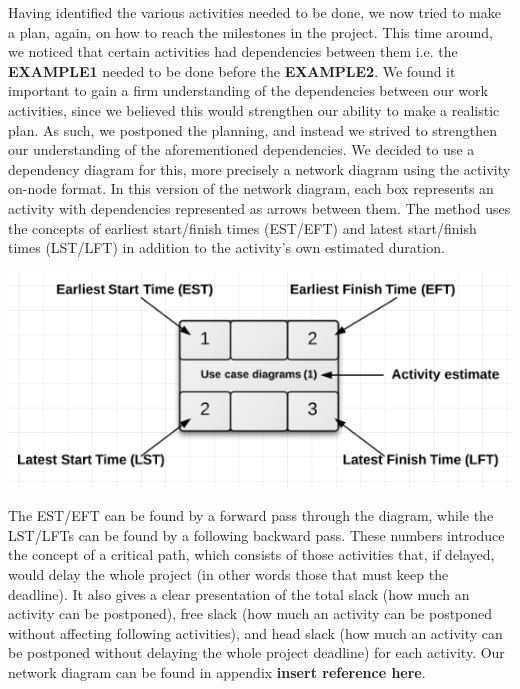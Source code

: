 Having identified the various activities needed to be done, we now tried to make a plan, again, on how to reach the milestones in the project. This time around, we noticed that certain activities had dependencies between them i.e. the \textbf{EXAMPLE1} needed to be done before the \textbf{EXAMPLE2}.
We found it important to gain a firm understanding of the dependencies between our work activities, since we believed this would strengthen our ability to make a realistic plan. As such, we postponed the planning, and instead we strived to strengthen our understanding of the aforementioned dependencies. We decided to use a dependency diagram for this, more precisely a network diagram using the activity on-node format.
In this version of the network diagram, each box represents an activity with dependencies represented as arrows between them. The method uses the concepts of earliest start/finish times (EST/EFT) and latest start/finish times (LST/LFT) in addition to the activity’s own estimated duration.

\includegraphics[scale=0.5]{./Empiri/Planning/img/networkdiagramnotation.png}
 
The EST/EFT can be found by a forward pass through the diagram, while the LST/LFTs can be found by a following backward pass.
These numbers introduce the concept of a critical path, which consists of those activities that, if delayed, would delay the whole project (in other words those that must keep the deadline). It also gives a clear presentation of the total slack (how much an activity can be postponed), free slack (how much an activity can be postponed without affecting following activities), and head slack (how much an activity can be postponed without delaying the whole project deadline) for each activity.
Our network diagram can be found in appendix \textbf{insert reference here}.